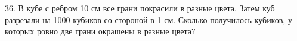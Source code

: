 36. В кубе с ребром 10 см все грани покрасили в разные цвета. Затем куб разрезали на 1000 кубиков со стороной в 1 см. Сколько получилось кубиков, у которых ровно две грани окрашены в разные цвета?\\
